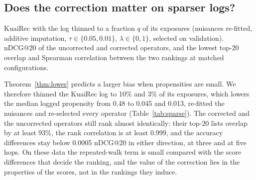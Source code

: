 \subsection{Does the correction matter on sparser logs?}\label{sec:sparse}

\begin{table}[t]\centering\small
\caption{KuaiRec with the log thinned to a fraction $q$ of its exposures
(nuisances re-fitted, additive imputation, $\tau\in\{0.05,0.01\}$, $\lambda\in\{0,1\}$,
selected on validation). nDCG@20 of the uncorrected and corrected operators, and
the lowest top-20 overlap and Spearman correlation between the two rankings at
matched configurations.}\label{tab:sparse}
\begin{adjustbox}{max width=\textwidth}

\end{adjustbox}
\end{table}

Theorem~\ref{thm:lower} predicts a larger bias when propensities are small. We
therefore thinned the KuaiRec log to 10\% and 3\% of its exposures, which lowers the
median logged propensity from 0.48 to 0.045 and 0.013, re-fitted the nuisances
and re-selected every operator (Table~\ref{tab:sparse}). The corrected and the
uncorrected operators still rank almost identically: their top-20 lists overlap
by at least 93\%, the rank correlation is at least 0.999, and the accuracy
differences stay below 0.0005 nDCG@20 in either direction, at three and at five
hops. On these data the repeated-walk term is small compared with the score
differences that decide the ranking, and the value of the correction lies in
the properties of the scores, not in the rankings they induce.
